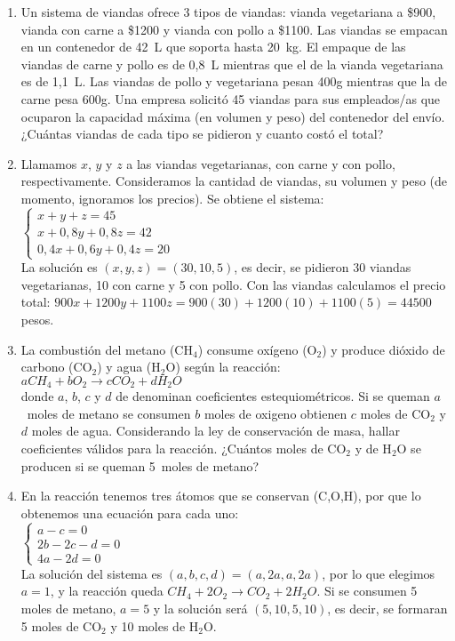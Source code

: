 \documentclass[a4paper]{article}
\newcommand{\answer}{\item[**]}
\begin{document}
\begin{enumerate}
\begin{enumerate} [label=(\alph*)]
		\item Un sistema de viandas ofrece 3 tipos de viandas: vianda vegetariana a \$900, vianda con carne a \$1200 y vianda con pollo a \$1100.  Las viandas se empacan en un contenedor de 42~L que soporta hasta 20~kg. El empaque de las viandas de carne y pollo es de 0,8~L mientras que el de la vianda vegetariana es de 1,1~L. Las viandas de pollo y vegetariana pesan 400g mientras que la de carne pesa 600g. Una empresa solicitó 45 viandas para sus empleados/as que ocuparon la capacidad máxima (en volumen y peso) del contenedor del envío. ¿Cuántas viandas de cada tipo se pidieron y cuanto costó el total?
		\answer Llamamos $x$, $y$ y $z$ a las viandas vegetarianas, con carne y con pollo, respectivamente. Consideramos la cantidad de viandas, su volumen y peso (de momento, ignoramos los precios). Se obtiene el sistema: \\ \vspace{2mm} $\left\{\begin{matrix} x+y+z=45 \\ x+0,8y+0,8z=42 \\ 0,4x+0,6y+0,4z=20 \end{matrix}\right.$ \\ La solución es $(x,y,z)=(30,10,5)$, es decir, se pidieron 30 viandas vegetarianas, 10 con carne y 5 con pollo. Con las viandas calculamos el precio total: $900x+1200y+1100z=900(30)+1200(10)+1100(5)=44500$ pesos.

		\item La combustión del metano (CH$_4$) consume oxígeno (O$_2$) y produce dióxido de carbono (CO$_2$) y agua (H$_2$O) según la reacción: \\ \phantom{-------------------------------------------------}$ aCH_4 + bO_2 \to cCO_2 + d H_{2}O$ \\ donde $a$, $b$, $c$ y $d$ de denominan coeficientes estequiométricos. Si se queman $a$~moles de metano se consumen $b$ moles de oxigeno obtienen $c$ moles de CO$_2$ y $d$ moles de agua. Considerando la ley de conservación de masa, hallar coeficientes válidos para la reacción. ¿Cuántos moles de CO$_2$ y de H$_2$O se producen si se queman 5~moles de metano? 
		\answer En la reacción tenemos tres átomos que se conservan (C,O,H), por que lo obtenemos una ecuación para cada uno: \\ \vspace{2mm} $\left\{\begin{matrix} a-c = 0 \\ 2b -2c -d = 0 \\ 4a - 2d = 0 \end{matrix}\right.$ \\ La solución del sistema es $(a,b,c,d) = (a,2a,a,2a)$, por lo que elegimos $a=1$, y la reacción queda $ CH_4 + 2O_2 \to CO_2 + 2 H_{2}O$. Si se consumen 5 moles de metano, $a=5$ y la solución será $(5,10,5,10)$, es decir, se formaran 5 moles de CO$_2$ y 10 moles de H$_2$O.


	\end{enumerate}


\end{enumerate}
\end{document}
